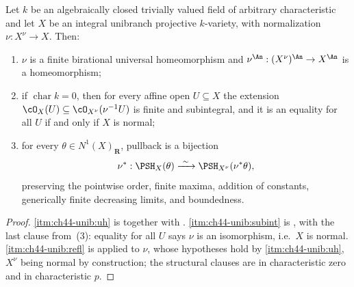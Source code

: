 \begin{corollary}
\label{cor:ch44-unibranch-normalization-reflection}
Let $k$ be an algebraically closed trivially valued field of arbitrary
characteristic and let $X$ be an integral unibranch projective
$k$-variety, with normalization $\nu:X^\nu\to X$.  Then:
\begin{enumerate}
\item\label{itm:ch44-unib:uh}
      $\nu$ is a finite birational universal homeomorphism and
      $\nu^{\An}:(X^\nu)^{\An}\to X^{\An}$ is a homeomorphism;
\item\label{itm:ch44-unib:subint}
      if $\operatorname{char}k=0$, then for every affine open
      $U\subseteq X$ the extension
      $\cO_X(U)\subseteq\cO_{X^\nu}(\nu^{-1}U)$ is finite and
      subintegral, and it is an equality for all $U$ if and only if
      $X$ is normal;
\item\label{itm:ch44-unib:refl}
      for every $\theta\in N^1(X)_{\mathbf R}$, pullback is a bijection
      \[
      \nu^*:\PSH_X(\theta)\xrightarrow{\ \sim\ }
             \PSH_{X^\nu}(\nu^*\theta),
      \]
      preserving the pointwise order, finite maxima, addition of constants,
      generically finite decreasing limits, and boundedness.
\end{enumerate}
\end{corollary}

\begin{proof}
\cref{itm:ch44-unib:uh} is
 together with
.
\cref{itm:ch44-unib:subint} is , with
the last clause from
\,(3): equality for all $U$
says $\nu$ is an isomorphism, i.e.\ $X$ is normal.
\cref{itm:ch44-unib:refl} is
 applied to $\nu$,
whose hypotheses hold by \cref{itm:ch44-unib:uh}, $X^\nu$ being normal by
construction; the structural clauses are
 in characteristic zero and
 in characteristic $p$.
\end{proof}


